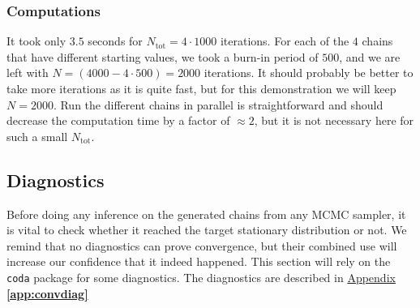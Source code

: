 \subsubsection*{Computations} 

It took only $3.5$ seconds for $N_{\text{tot}}=4\cdot 1000$ iterations. For each of the $4$ chains that have different starting values, we took a burn-in period of $500$, and we are left with $N=(4000-4\cdot 500)=2000$ iterations. It should probably be better to take more iterations as it is quite fast, but for this demonstration we will keep $N=2000$.
Run the different chains in parallel is straightforward and should decrease the computation time by a factor of $\approx 2$, but it is not necessary here for such a small $N_{\text{tot}}$.
 
 
\subsection{Diagnostics}

Before doing any inference on the generated chains from any MCMC sampler, it is vital to check whether it reached the target stationary distribution or not.
We remind that no diagnostics can prove convergence, but their combined use will increase our confidence that it indeed happened.
This section will rely on the \texttt{coda} package for some diagnostics. The diagnostics are described in \hyperref[app:convdiag]{Appendix \textbf{\ref{app:convdiag}}}

